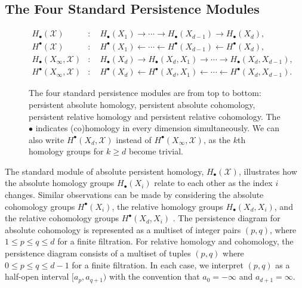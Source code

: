 \subsection{The Four Standard Persistence Modules}
\label{TheFourStandardPersistenceModules}
\begin{figure}[htb!]
	\begin{align*}
		H_{\bullet}(\mathcal{X})             & : \quad H_{\bullet}(X_{1}) \rightarrow \cdots \rightarrow H_{\bullet}(X_{d-1}) \rightarrow H_{\bullet}(X_{d}),             \\
		H^{\bullet}(\mathcal{X})             & : \quad H^{\bullet}(X_{1}) \leftarrow \cdots \leftarrow H^{\bullet}(X_{d-1}) \leftarrow H^{\bullet}(X_{d}),                \\
		H_{\bullet}(X_{\infty}, \mathcal{X}) & : \quad H_{\bullet}(X_{d}) \rightarrow H_{\bullet}(X_{d},X_{1}) \rightarrow \cdots \rightarrow H_{\bullet}(X_{d},X_{d-1}), \\
		H^{\bullet}(X_{\infty}, \mathcal{X}) & : \quad H^{\bullet}(X_{d}) \leftarrow H^{\bullet}(X_{d},X_{1}) \leftarrow \cdots \leftarrow H^{\bullet}(X_{d}, X_{d-1}).
	\end{align*}
	\caption{The four standard persistence modules are from top to bottom: persistent absolute homology, persistent absolute cohomology, persistent relative homology and persistent relative cohomology. The $\bullet$ indicates (co)homology in every dimension simultaneously. We can also write $H^{\bullet}(X_{d}, \mathcal{X})$ instead of $H^{\bullet}(X_{\infty}, \mathcal{X})$, as the $k$th homology groups for $k \geq d$ become trivial.}
\end{figure}
The standard module of absolute persistent homology, $H_{\bullet}(\mathcal{X})$, illustrates how the absolute homology groups
$H_{\bullet}(X_{i})$ relate to each other as the index $i$ changes. Similar observations
can be made by considering the absolute cohomology groups $H^{\bullet}(X_{i})$,
the relative homology groups $H_{\bullet}(X_{d}, X_{i})$, and the relative cohomology
groups $H^{\bullet}(X_{d}, X_{i})$ \cite[\S 2.4]{de2011dualities}. The persistence diagram for absolute cohomology is represented as a multiset of integer
pairs $(p,q)$, where $1 \leq p \leq q \leq d$ for a finite filtration. For relative
homology and cohomology, the persistence diagram consists of a multiset of
tuples $(p,q)$ where $0 \leq p \leq q \leq d-1$ for a finite filtration. In each
case, we interpret $(p,q)$ as a half-open interval $[a_{p}, a_{q+1})$ with the
convention that $a_{0} = -\infty$ and $a_{d+1} = \infty$.

